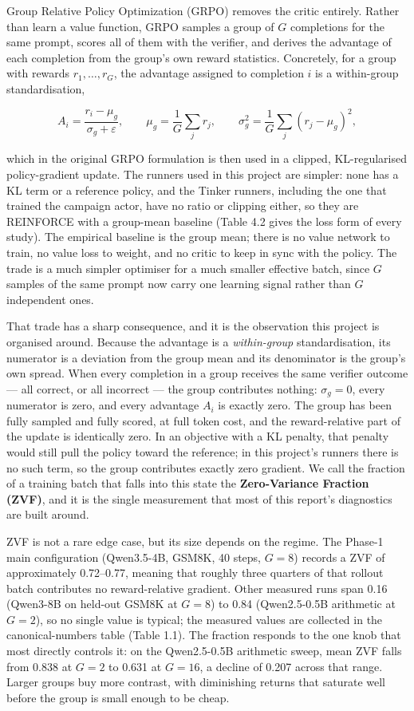 \documentclass[12pt,a4paper]{report}
\begin{document}
Group Relative Policy Optimization (GRPO) removes the critic entirely.
Rather than learn a value function, GRPO samples a group of \(G\)
completions for the same prompt, scores all of them with the verifier,
and derives the advantage of each completion from the group's own reward
statistics. Concretely, for a group with rewards \(r_1, \dots, r_G\),
the advantage assigned to completion \(i\) is a within-group
standardisation,

\[A_i = \frac{r_i - \mu_g}{\sigma_g + \varepsilon}, \qquad \mu_g = \frac{1}{G}\sum_j r_j, \qquad \sigma_g^2 = \frac{1}{G}\sum_j (r_j - \mu_g)^2,\]

which in the original GRPO formulation is then used in a clipped,
KL-regularised policy-gradient update. The runners used in this project
are simpler: none has a KL term or a reference policy, and the Tinker
runners, including the one that trained the campaign actor, have no
ratio or clipping either, so they are REINFORCE with a group-mean
baseline (Table 4.2 gives the loss form of every study). The empirical
baseline is the group mean; there is no value network to train, no value
loss to weight, and no critic to keep in sync with the policy. The trade
is a much simpler optimiser for a much smaller effective batch, since
\(G\) samples of the same prompt now carry one learning signal rather
than \(G\) independent ones.

That trade has a sharp consequence, and it is the observation this
project is organised around. Because the advantage is a
\emph{within-group} standardisation, its numerator is a deviation from
the group mean and its denominator is the group's own spread. When every
completion in a group receives the same verifier outcome --- all
correct, or all incorrect --- the group contributes nothing:
\(\sigma_g = 0\), every numerator is zero, and every advantage \(A_i\)
is exactly zero. The group has been fully sampled and fully scored, at
full token cost, and the reward-relative part of the update is
identically zero. In an objective with a KL penalty, that penalty would
still pull the policy toward the reference; in this project's runners
there is no such term, so the group contributes exactly zero gradient.
We call the fraction of a training batch that falls into this state the
\textbf{Zero-Variance Fraction (ZVF)}, and it is the single measurement
that most of this report's diagnostics are built around.

ZVF is not a rare edge case, but its size depends on the regime. The
Phase-1 main configuration (Qwen3.5-4B, GSM8K, 40 steps, \(G = 8\))
records a ZVF of approximately 0.72--0.77, meaning that roughly three
quarters of that rollout batch contributes no reward-relative gradient.
Other measured runs span 0.16 (Qwen3-8B on held-out GSM8K at \(G = 8\))
to 0.84 (Qwen2.5-0.5B arithmetic at \(G = 2\)), so no single value is
typical; the measured values are collected in the canonical-numbers
table (Table 1.1). The fraction responds to the one knob that most
directly controls it: on the Qwen2.5-0.5B arithmetic sweep, mean ZVF
falls from 0.838 at \(G = 2\) to 0.631 at \(G = 16\), a decline of 0.207
across that range. Larger groups buy more contrast, with diminishing
returns that saturate well before the group is small enough to be cheap.
\end{document}
